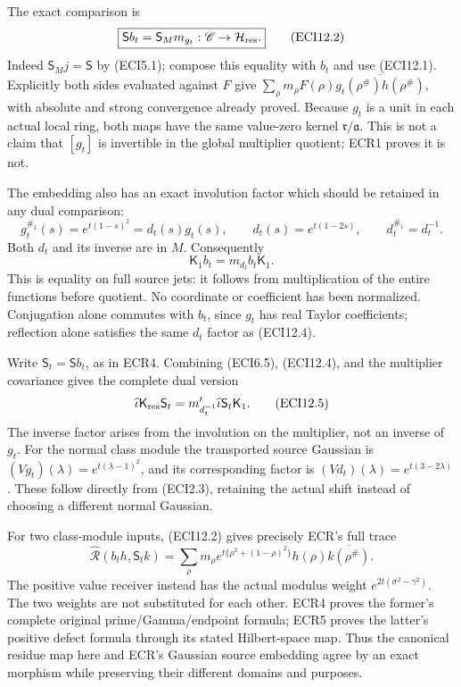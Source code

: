 The exact comparison is \[
\boxed{\mathsf S b_t=\mathsf S_M m_{g_t}:\mathscr C\to\mathcal H_{\rm res}.}
\tag{ECI12.2}
\] Indeed \(\mathsf S_Mj=\mathsf S\) by (ECI5.1); compose this equality
with \(b_t\) and use (ECI12.1). Explicitly both sides evaluated against
\(F\) give
\(\sum_\rho m_\rho F(\rho)\overline{g_t(\rho^\#)h(\rho^\#)}\), with
absolute and strong convergence already proved. Because \(g_t\) is a
unit in each actual local ring, both maps have the same value-zero
kernel \(\mathfrak r/\mathfrak a\). This is not a claim that \([g_t]\)
is invertible in the global multiplier quotient; ECR1 proves it is not.

The embedding also has an exact involution factor which should be
retained in any dual comparison: \[
g_t^{\#_1}(s)=e^{t(1-s)^2}=d_t(s)g_t(s),
\qquad d_t(s)=e^{t(1-2s)},
\qquad d_t^{\#_1}=d_t^{-1}.
\tag{ECI12.3}
\] Both \(d_t\) and its inverse are in \(M\). Consequently \[
\mathsf K_1 b_t=m_{d_t}b_t\mathsf K_1.
\tag{ECI12.4}
\] This is equality on full source jets: it follows from multiplication
of the entire functions before quotient. No coordinate or coefficient
has been normalized. Conjugation alone commutes with \(b_t\), since
\(g_t\) has real Taylor coefficients; reflection alone satisfies the
same \(d_t\) factor as (ECI12.4).

Write \(\mathsf S_t=\mathsf S b_t\), as in ECR4. Combining (ECI6.5),
(ECI12.4), and the multiplier covariance gives the complete dual version
\[
\widehat\iota\mathsf K_{\rm res}\mathsf S_t
=m_{d_t^{-1}}'\widehat\iota\mathsf S_t\mathsf K_1.
\tag{ECI12.5}
\] The inverse factor arises from the involution on the multiplier, not
an inverse of \(g_t\). For the normal class module the transported
source Gaussian is \((Vg_t)(\lambda)=e^{t(\lambda-1)^2}\), and its
corresponding factor is \((Vd_t)(\lambda)=e^{t(3-2\lambda)}\). These
follow directly from (ECI2.3), retaining the actual shift instead of
choosing a different normal Gaussian.

For two class-module inputs, (ECI12.2) gives precisely ECR's full trace
\[
\widehat{\mathcal R}(b_th,\mathsf S_tk)
=\sum_\rho m_\rho e^{t\{\rho^2+(1-\rho)^2\}}
h(\rho)\overline{k(\rho^\#)}.
\tag{ECI12.6}
\] The positive value receiver instead has the actual modulus weight
\(e^{2t(\sigma^2-\gamma^2)}\). The two weights are not substituted for
each other. ECR4 proves the former's complete original
prime/Gamma/endpoint formula; ECR5 proves the latter's positive defect
formula through its stated Hilbert-space map. Thus the canonical residue
map here and ECR's Gaussian source embedding agree by an exact morphism
while preserving their different domains and purposes.

